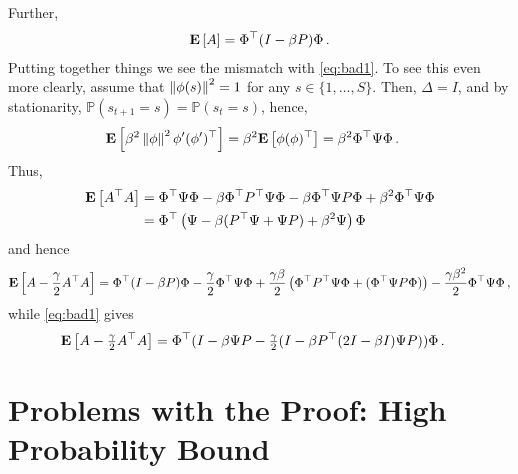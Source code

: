 \documentclass{article}
\newcommand{\Prob}[1]{\mathbb{P}\left(#1\right)}
\begin{document}
Further,
\begin{align*}
\mathbf{E}\left[ A \right]  = \Phi^\top (I - \beta P) \Phi\,.
\end{align*}
Putting together things we see the mismatch with \eqref{eq:bad1}.
To see this even more clearly, assume that $ \left\| \phi(s)\right\|^2 = 1$ for any $s\in \{1,\dots,S\}$.
Then, $\Delta = I$, and by stationarity, $\Prob{s_{t+1} = s } = \Prob{s_t=s}$, hence,
\begin{align*}
\mathbf{E}\left[ \beta^2  \left\| \phi\right\|^2 \phi' (\phi')^\top \right] & =
\beta^2 \mathbf{E}\left[ \phi (\phi)^\top \right] =\beta^2 \Phi^\top \Psi \Phi\, .
\end{align*}
Thus, 
\begin{align*}
\mathbf{E}\left[ A^\top A \right] & = 
\Phi^\top  \Psi \Phi -  \beta \Phi^\top P^\top  \Psi \Phi - \beta \Phi^\top  \Psi P \Phi + \beta^2 \Phi^\top \Psi \Phi \\
& = 
\Phi^\top  \left(\Psi -  \beta  (P^\top  \Psi +   \Psi P) + \beta^2 \Psi \right) \Phi \\
\end{align*}
and hence
\begin{align*}
\mathbf{E}\left[ A - \frac{\gamma}{2} A^\top A \right] = 
 \Phi^\top (I - \beta P) \Phi - \frac{\gamma}{2} 
 \Phi^\top  \Psi \Phi + \frac{\gamma\beta }{2} \left( \Phi^\top P^\top  \Psi \Phi + (\Phi^\top  \Psi P \Phi) \right)
 - \frac{\gamma\beta^2}{2}\Phi^\top \Psi \Phi\,,
\end{align*}
while \eqref{eq:bad1} gives
\begin{align*}
\mathbf{E}\left[ A - \tfrac{\gamma}{2} A^\top A  \right] 
& = \Phi^\top (I - \beta \Psi P - \tfrac{\gamma}{2}(I - \beta P^\top (2I - \beta I)\Psi P) ) \Phi\,.
\end{align*}


\section{Problems with the Proof: High Probability Bound}
\end{document}
